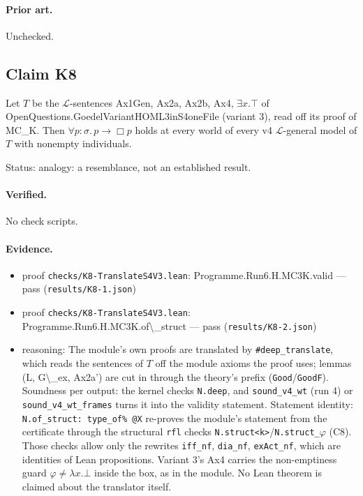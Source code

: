 \documentclass{article}
\begin{document}
\paragraph{Prior art.} Unchecked.

\subsection*{Claim K8}

Let $T$ be the $\mathcal L$-sentences Ax1Gen, Ax2a, Ax2b, Ax4, $\exists x.\top$ of OpenQuestions.GoedelVariantHOML3inS4oneFile (variant 3), read off its proof of MC\_K. Then $\forall p{:}\sigma.\,p\to\Box p$ holds at every world of every v4 $\mathcal L$-general model of $T$ with nonempty individuals.

Status: analogy: a resemblance, not an established result.

\paragraph{Verified.}
No check scripts.

\paragraph{Evidence.}
\begin{itemize}
\item proof \texttt{checks/K8-TranslateS4V3.lean}: Programme.Run6.H.MC3K.valid --- pass (\texttt{results/K8-1.json})
\item proof \texttt{checks/K8-TranslateS4V3.lean}: Programme.Run6.H.MC3K.of\textbackslash{}\_struct --- pass (\texttt{results/K8-2.json})
\item reasoning: The module's own proofs are translated by \texttt{\#deep\_translate}, which reads the sentences of $T$ off the module axioms the proof uses; lemmas (L, G\textbackslash{}\_ex, Ax2a') are cut in through the theory's prefix (\texttt{Good}/\texttt{GoodF}). Soundness per output: the kernel checks \texttt{N.deep}, and \texttt{sound\_v4\_wt} (run 4) or \texttt{sound\_v4\_wt\_frames} turns it into the validity statement. Statement identity: \texttt{N.of\_struct: type\_of\% @X} re-proves the module's statement from the certificate through the structural \texttt{rfl} checks \texttt{N.struct\textless{}k\textgreater{}}/\texttt{N.struct\_$\varphi$} (C8). Those checks allow only the rewrites \texttt{iff\_nf}, \texttt{dia\_nf}, \texttt{exAct\_nf}, which are identities of Lean propositions. Variant 3's Ax4 carries the non-emptiness guard $\varphi\neq\lambda x.\bot$ inside the box, as in the module. No Lean theorem is claimed about the translator itself.
\end{itemize}
\end{document}
